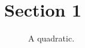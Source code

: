 \documentclass[example-with-subfiles.tex]{subfiles}
\begin{document}
    \section{Section 1}

    \begin{figure}[h]
        \caption{A quadratic.}
        \label{fig:quadratic}
    \end{figure}

\end{document}
